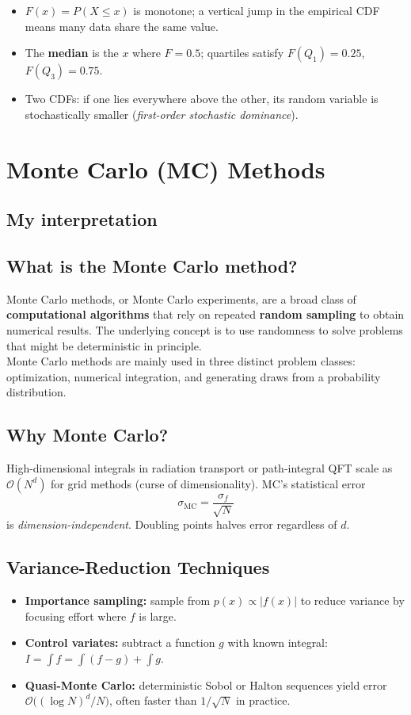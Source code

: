 \documentclass[a4paper,11pt]{article}
\begin{document}
\begin{itemize}
  \item $F(x)=P(X\le x)$ is monotone; a vertical jump in the empirical CDF means many data share the same value.
  \item The \textbf{median} is the $x$ where $F=0.5$; quartiles satisfy $F(Q_1)=0.25$, $F(Q_3)=0.75$.
  \item Two CDFs: if one lies everywhere above the other, its random variable is stochastically smaller (\emph{first-order stochastic dominance}).
\end{itemize}

\section{Monte Carlo (MC) Methods}
\subsection{My interpretation}

\subsection{What is the Monte Carlo method?}
Monte Carlo methods, or Monte Carlo experiments, are a broad class of \textbf{computational algorithms} that rely on repeated \textbf{random sampling} to obtain numerical results. The underlying concept is to use randomness to solve problems that might be deterministic in principle.
\\
Monte Carlo methods are mainly used in three distinct problem classes: optimization, numerical integration, and generating draws from a probability distribution.

\subsection{Why Monte Carlo?}
High-dimensional integrals in radiation transport or path-integral QFT scale as $\mathcal O(N^d)$ for grid methods (curse of dimensionality).  
MC’s statistical error
\[
  \sigma_{\text{MC}}=\frac{\sigma_f}{\sqrt{N}}
\]
is \emph{dimension-independent}.  Doubling points halves error regardless of $d$.

\subsection{Variance-Reduction Techniques}
\begin{itemize}
  \item \textbf{Importance sampling:} sample from $p(x)\propto |f(x)|$ to reduce variance by focusing effort where $f$ is large.
  \item \textbf{Control variates:} subtract a function $g$ with known integral: $I=\int f =\int (f-g)+\int g$.
  \item \textbf{Quasi-Monte Carlo:} deterministic Sobol or Halton sequences yield error $\mathcal O\!\bigl((\log N)^d/N\bigr)$, often faster than $1/\sqrt N$ in practice.
\end{itemize}
\end{document}
